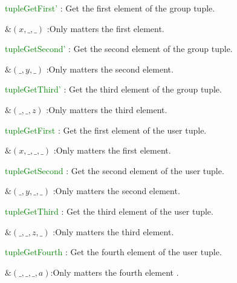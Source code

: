 \documentclass{aes2e}
\begin{document}
\begin{alphalist}[style=sameline]



\item{}\textcolor{green}{tupleGetFirst'} :  Get the first element of the group tuple.\newline

$\&(x, \_, \_) $ :Only matters the first element.\newline

\item{}\textcolor{green}{tupleGetSecond'} :  Get the second element of the group tuple.\newline

$\&(\_, y, \_) $ :Only matters the second element.\newline

\item{}\textcolor{green}{tupleGetThird'} :  Get the third element of the group tuple.\newline


$\&(\_, \_, z) $ :Only matters the third element.\newline
  
\item{}\textcolor{green}{tupleGetFirst} :  Get the first element of the user tuple.\newline

$\&(x, \_, \_,\_) $ :Only matters the first element.\newline

\item{}\textcolor{green}{tupleGetSecond} :  Get the second element of the user tuple.\newline

$\&(\_, y, \_,\_) $ :Only matters the second element.\newline

\item{}\textcolor{green}{tupleGetThird} :  Get the third element of the user tuple.\newline

$\&(\_, \_, z,\_) $ :Only matters the third element.\newline

\item{}\textcolor{green}{tupleGetFourth} :  Get the fourth element of the user tuple.\newline

$\&(\_, \_, \_,a)$:Only matters the fourth element .\newline
\end{alphalist}
\end{document}
